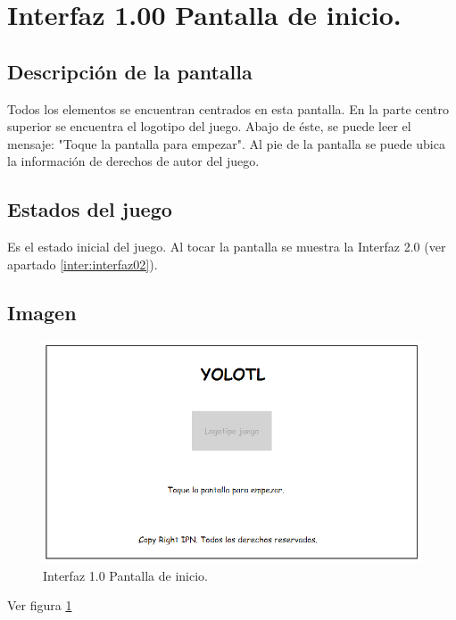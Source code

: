 	\section{Interfaz 1.00 Pantalla de inicio.} \label{inter:interfaz01}
	\subsection{Descripción de la pantalla}
Todos los elementos se encuentran centrados en esta pantalla. En la parte centro superior se encuentra el logotipo del juego. Abajo de éste, se puede leer el mensaje: "Toque la pantalla para empezar". Al pie de la pantalla se puede ubica la información de derechos de autor del juego.
	\subsection{Estados del juego}
Es el estado inicial del juego.
Al tocar la pantalla se muestra la Interfaz 2.0 (ver apartado \ref{inter:interfaz02}).
	\subsection{Imagen}
\begin{figure}
  \centering
   \includegraphics[width=0.6 \textwidth]{Imagenes/interfaz00}
  \caption{Interfaz 1.0 Pantalla de inicio.}
  \label{fig:PInicio}
\end{figure} 

Ver figura \ref{fig:PInicio}
